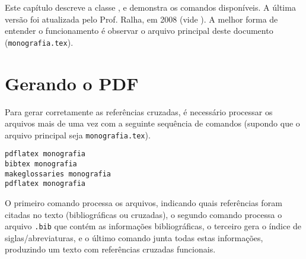 \newcommand{\texCommand}[1]{\texttt{\textbackslash{#1}}}%

\newcommand{\exemplo}[1]{%
\vspace{\baselineskip}%
\noindent\fbox{\begin{minipage}{\textwidth}#1\end{minipage}}%
\\\vspace{\baselineskip}}%

\newcommand{\exemploVerbatim}[1]{%
\vspace{\baselineskip}%
\noindent\fbox{\begin{minipage}{\textwidth}%
#1\end{minipage}}%
\\\vspace{\baselineskip}}%


Este capítulo descreve a classe \unbcic, e demonstra os comandos disponíveis. A
última versão foi atualizada pelo Prof. Ralha, em 2008 (vide ).
A melhor forma de entender o funcionamento é observar o arquivo principal deste
documento (\texttt{monografia.tex}).


\section{Gerando o PDF}

Para gerar corretamente as referências cruzadas, é necessário processar os arquivos
mais de uma vez com a seguinte sequência de comandos (supondo que o arquivo
principal seja \texttt{monografia.tex}).

\begin{verbatim}
pdflatex monografia
bibtex monografia
makeglossaries monografia
pdflatex monografia
\end{verbatim}

O primeiro comando processa os arquivos, indicando quais referências foram citadas
no texto (bibliográficas ou cruzadas), o segundo comando processa o arquivo
\texttt{.bib} que contém as informações bibliográficas, o terceiro gera o índice
de siglas/abreviaturas, e o último comando junta todas estas informações,
produzindo um texto com referências cruzadas funcionais.



